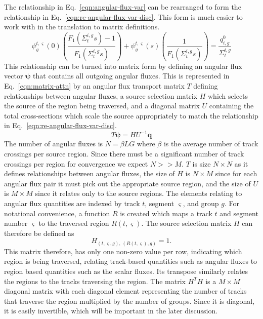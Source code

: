 The relationship in Eq.~\ref{eqn:angular-flux-var} can be rearranged to form the relationship in Eq.~\ref{eqn:re-angular-flux-var-disc}. This form is much easier to work with in the translation to matrix definitions.
\begin{equation}
\psi^{t,\varsigma}_g(0) \left(\frac{F_1\left(\Sigma_{t}^{i,g} s \right) - 1}{F_1\left(\Sigma_{t}^{i,g} s \right)}\right) + \psi_g^{t,\varsigma}(s) \left(\frac{1}{F_1\left(\Sigma_{t}^{i,g} s \right)}\right) = \frac{q^0_{i,g}}{\Sigma_{t}^{i,g}}
\label{eqn:re-angular-flux-var-disc}
\end{equation}
This relationship can be turned into matrix form by defining an angular flux vector $\boldsymbol{\psi}$ that contains all outgoing angular fluxes. This is represented in Eq.~\ref{eqn:matrix-attn} by an angular flux transport matrix $T$ defining relationships between angular fluxes, a source selection matrix $H$ which selects the source of the region being traversed, and a diagonal matrix $U$ containing the total cross-sections which scale the source appropriately to match the relationship in Eq.~\ref{eqn:re-angular-flux-var-disc}.
\begin{equation}
T \boldsymbol{\psi} = H U^{-1} \mathbf{q}
\label{eqn:matrix-attn}
\end{equation}
The number of angular fluxes is $N = \beta L G$ where $\beta$ is the average number of track crossings per source region. Since there must be a significant number of track crossings per region for convergence we expect $N >> M$. $T$ is size $N \times N$ as it defines relationships between angular fluxes, the size of $H$ is $N \times M$ since for each angular flux pair it must pick out the appropriate source region, and the size of $U$ is $M \times M$ since it relates only to the source regions. The elements relating to angular flux quantities are indexed by track $t$, segment $\varsigma$, and group $g$. For notational convenience, a function $R$ is created which maps a track $t$ and segment number $\varsigma$ to the traversed region $R(t,\varsigma)$. The source selection matrix $H$ can therefore be defined as
\begin{equation}
H_{\left(t,\varsigma,g\right), \, \left(R(t,\varsigma), g\right)} = 1.
\label{eqn:source-selection-matrix}
\end{equation}
This matrix therefore, has only one non-zero value per row, indicating which region is being traversed, relating track-based quantities such as angular fluxes to region based quantities such as the scalar fluxes. Its transpose similarly relates the regions to the tracks traversing the region. The matrix $H^T H$ is a $M \times M$ diagonal matrix with each diagonal element representing the number of tracks that traverse the region multiplied by the number of groups. Since it is diagonal, it is easily invertible, which will be important in the later discussion.
